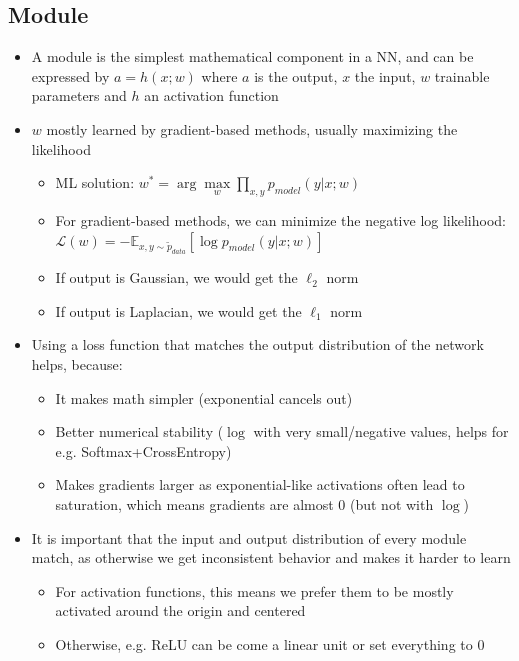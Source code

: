 \subsection{Module}
\begin{itemize}
	\item A module is the simplest mathematical component in a NN, and can be expressed by $a=h(x;w)$ where $a$ is the output, $x$ the input, $w$ trainable parameters and $h$ an activation function
	\item $w$ mostly learned by gradient-based methods, usually maximizing the likelihood
	\begin{itemize}
		\item ML solution: $w^{*} = \arg\max\limits_{w}\prod\limits_{x,y}p_{model}\left(y|x;w\right)$
		\item For gradient-based methods, we can minimize the negative log likelihood:\\ $\mathcal{L}(w) = -\mathbb{E}_{x,y\sim \tilde{p}_{data}}\left[\log p_{model}\left(y|x;w\right)\right]$
		\item If output is Gaussian, we would get the $\ell_2$ norm
		\item If output is Laplacian, we would get the $\ell_1$ norm
	\end{itemize} 
	\item Using a loss function that matches the output distribution of the network helps, because:
	\begin{itemize}
		\item It makes math simpler (exponential cancels out)
		\item Better numerical stability ($\log$ with very small/negative values, helps for e.g. Softmax+CrossEntropy)
		\item Makes gradients larger as exponential-like activations often lead to saturation, which means gradients are almost 0 (but not with $\log$)
	\end{itemize}
	\item It is important that the input and output distribution of every module match, as otherwise we get inconsistent behavior and makes it harder to learn
	\begin{itemize}
		\item For activation functions, this means we prefer them to be mostly activated around the origin and centered
		\item Otherwise, e.g. ReLU can be come a linear unit or set everything to 0
	\end{itemize}
\end{itemize}
